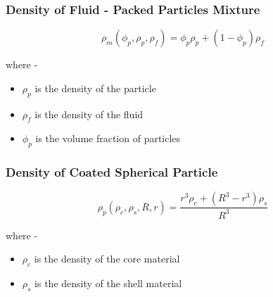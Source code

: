 \documentclass[../main.tex]{subfiles}
\begin{document}
\subsubsection{Density of Fluid - Packed Particles Mixture}

\begin{equation}
    \rho_m \left( \phi_p, \rho_p, \rho_f \right) = \phi_p \rho_p + \left( 1 - \phi_p \right) \rho_f
\end{equation}

where -

\begin{itemize}
    \item $\rho_p$ is the density of the particle
    \item $\rho_f$ is the density of the fluid
    \item $\phi_p$ is the volume fraction of particles
\end{itemize}

\subsubsection{Density of Coated Spherical Particle}

\begin{equation}
    \rho_p \left( \rho_c, \rho_s, R, r \right) = \frac{r^3 \rho_c + \left( R^3 - r^3 \right) \rho_s}{R^3}
\end{equation}

where -

\begin{itemize}
    \item $\rho_c$ is the density of the core material
    \item $\rho_s$ is the density of the shell material
\end{itemize}
\end{document}

